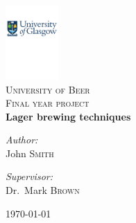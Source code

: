 \begin{titlepage}
\begin{center}

\includegraphics[width=0.15\textwidth]{UniversityLogoNoText}~\\[1cm]

\textsc{\LARGE University of Beer}\\[1.5cm]

\textsc{\Large Final year project}\\[0.5cm]

{ \huge \bfseries Lager brewing techniques}\\[0.4cm]


\begin{minipage}{0.4\textwidth}
\begin{flushleft} \large
\emph{Author:}\\
John \textsc{Smith}
\end{flushleft}
\end{minipage}
\begin{minipage}{0.4\textwidth}
\begin{flushright} \large
\emph{Supervisor:} \\
Dr.~Mark \textsc{Brown}
\end{flushright}
\end{minipage}

\vfill

{\large \today}

\end{center}
\end{titlepage}

